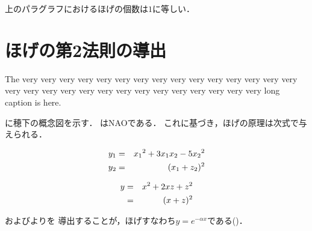\begin{small}
上のパラグラフにおけるほげの個数は$1$に等しい．


\section{ほげの第2法則の導出}


{\baselineskip=9pt The very very very very very very very very very very very very very
very very very very very very very very very very very very very very
very very long caption is here.}

に穂下の概念図を示す．
はNAOである．
これに基づき，ほげの原理は次式で与えられる\cite{hooogeBook}．

\begin{eqnarray}
\equlabel{hoge1}
y_1 & = & {x_1}^2 + 3x_1x_2 - 5{x_2}^2 \\
\equlabel{hoge2}
y_2 & = & (x_1 + z_2)^2
\end{eqnarray}

\begin{eqnarray}
\equlabel{hoge3}
y & = & x^2 + 2xz + z^2 \nonumber\\
  & = & (x + z)^2
\end{eqnarray}


およびよりを
導出することが，ほげすなわち$y=e^{-\alpha x}$である()．








{


}

\end{small}

